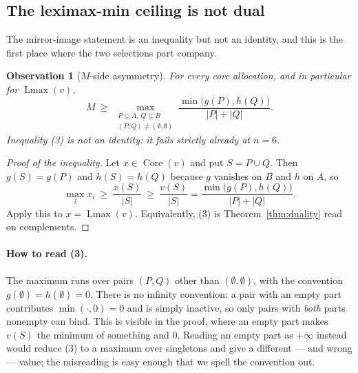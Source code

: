 \documentclass[11pt]{article}
\newtheorem{observation}[theorem]{Observation}
\newcommand{\core}{\operatorname{Core}}
\newcommand{\Lmax}{\operatorname{Lmax}}
\begin{document}
\subsection{The leximax-min ceiling is not dual}

The mirror-image statement is an inequality but not an identity, and this is
the first place where the two selections part company.

\begin{observation}[$M$-side asymmetry]\label{obs:Mside}
For every core allocation, and in particular for $\Lmax(v)$,
\[
 M\ \ge\ \max_{\substack{P\subseteq A,\ Q\subseteq B\\ (P,Q)\ne(\emptyset,\emptyset)}}
 \frac{\min\bigl(g(P),h(Q)\bigr)}{|P|+|Q|}. \tag{3}
\]
Inequality (3) is not an identity: it fails strictly already at $n=6$.
\end{observation}

\begin{proof}[Proof of the inequality]
Let $x\in\core(v)$ and put $S=P\cup Q$.  Then $g(S)=g(P)$ and $h(S)=h(Q)$
because $g$ vanishes on $B$ and $h$ on $A$, so
\[
 \max_i x_i\ \ge\ \frac{x(S)}{|S|}\ \ge\ \frac{v(S)}{|S|}
 =\frac{\min\bigl(g(P),h(Q)\bigr)}{|P|+|Q|}.
\]
Apply this to $x=\Lmax(v)$.  Equivalently, (3) is Theorem~\ref{thm:duality}
read on complements.
\end{proof}

\paragraph{How to read (3).}
The maximum runs over pairs $(P,Q)$ other than $(\emptyset,\emptyset)$, with
the convention $g(\emptyset)=h(\emptyset)=0$.  There is no infinity
convention: a pair with an empty part contributes $\min(\cdot,0)=0$ and is
simply inactive, so only pairs with \emph{both} parts nonempty can bind.
This is visible in the proof, where an empty part makes $v(S)$ the minimum of
something and $0$.  Reading an empty part as $+\infty$ instead would reduce
(3) to a maximum over singletons and give a different --- and wrong --- value;
the misreading is easy enough that we spell the convention out.
\end{document}

